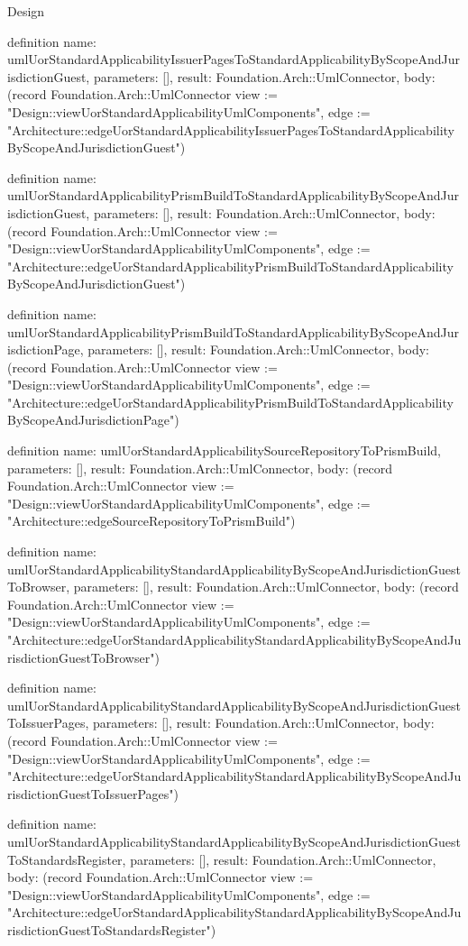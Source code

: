 \begin{lexlean}{Design}
\begin{semanticmodule}
definition{
  name: umlUorStandardApplicabilityIssuerPagesToStandardApplicabilityByScopeAndJurisdictionGuest,
  parameters: [],
  result: Foundation.Arch::UmlConnector,
  body: (record Foundation.Arch::UmlConnector {view := "Design::viewUorStandardApplicabilityUmlComponents", edge := "Architecture::edgeUorStandardApplicabilityIssuerPagesToStandardApplicabilityByScopeAndJurisdictionGuest"})
}

definition{
  name: umlUorStandardApplicabilityPrismBuildToStandardApplicabilityByScopeAndJurisdictionGuest,
  parameters: [],
  result: Foundation.Arch::UmlConnector,
  body: (record Foundation.Arch::UmlConnector {view := "Design::viewUorStandardApplicabilityUmlComponents", edge := "Architecture::edgeUorStandardApplicabilityPrismBuildToStandardApplicabilityByScopeAndJurisdictionGuest"})
}

definition{
  name: umlUorStandardApplicabilityPrismBuildToStandardApplicabilityByScopeAndJurisdictionPage,
  parameters: [],
  result: Foundation.Arch::UmlConnector,
  body: (record Foundation.Arch::UmlConnector {view := "Design::viewUorStandardApplicabilityUmlComponents", edge := "Architecture::edgeUorStandardApplicabilityPrismBuildToStandardApplicabilityByScopeAndJurisdictionPage"})
}

definition{
  name: umlUorStandardApplicabilitySourceRepositoryToPrismBuild,
  parameters: [],
  result: Foundation.Arch::UmlConnector,
  body: (record Foundation.Arch::UmlConnector {view := "Design::viewUorStandardApplicabilityUmlComponents", edge := "Architecture::edgeSourceRepositoryToPrismBuild"})
}

definition{
  name: umlUorStandardApplicabilityStandardApplicabilityByScopeAndJurisdictionGuestToBrowser,
  parameters: [],
  result: Foundation.Arch::UmlConnector,
  body: (record Foundation.Arch::UmlConnector {view := "Design::viewUorStandardApplicabilityUmlComponents", edge := "Architecture::edgeUorStandardApplicabilityStandardApplicabilityByScopeAndJurisdictionGuestToBrowser"})
}

definition{
  name: umlUorStandardApplicabilityStandardApplicabilityByScopeAndJurisdictionGuestToIssuerPages,
  parameters: [],
  result: Foundation.Arch::UmlConnector,
  body: (record Foundation.Arch::UmlConnector {view := "Design::viewUorStandardApplicabilityUmlComponents", edge := "Architecture::edgeUorStandardApplicabilityStandardApplicabilityByScopeAndJurisdictionGuestToIssuerPages"})
}

definition{
  name: umlUorStandardApplicabilityStandardApplicabilityByScopeAndJurisdictionGuestToStandardsRegister,
  parameters: [],
  result: Foundation.Arch::UmlConnector,
  body: (record Foundation.Arch::UmlConnector {view := "Design::viewUorStandardApplicabilityUmlComponents", edge := "Architecture::edgeUorStandardApplicabilityStandardApplicabilityByScopeAndJurisdictionGuestToStandardsRegister"})
}


\end{semanticmodule}
\end{lexlean}

